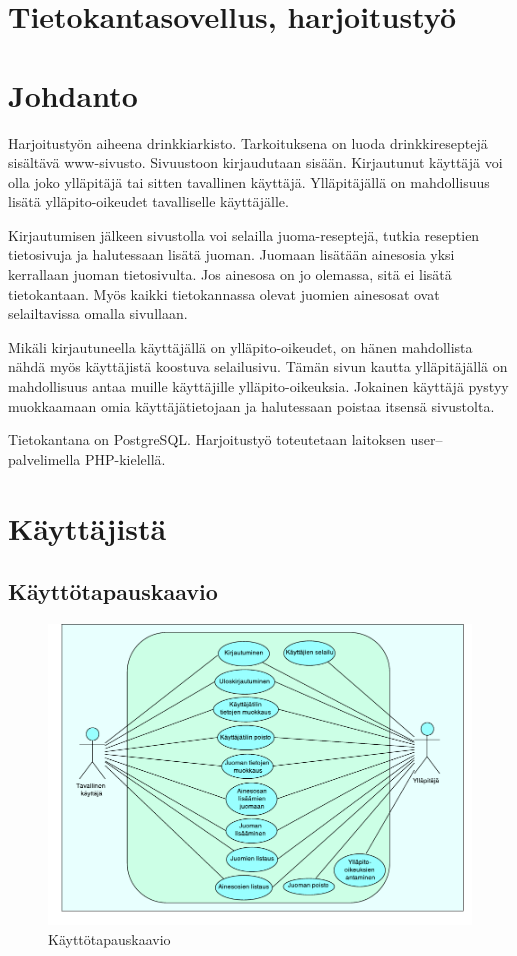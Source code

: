 \documentclass[a4paper]{article}
\begin{document}
\section*{Tietokantasovellus, harjoitustyö}

\tableofcontents

\section{Johdanto}

Harjoitustyön aiheena drinkkiarkisto. Tarkoituksena on luoda drinkkireseptejä sisältävä www-sivusto. Sivuustoon kirjaudutaan sisään. Kirjautunut käyttäjä voi olla joko ylläpitäjä tai sitten tavallinen käyttäjä. Ylläpitäjällä on mahdollisuus lisätä ylläpito-oikeudet tavalliselle käyttäjälle.   

Kirjautumisen jälkeen sivustolla voi selailla juoma-reseptejä, tutkia reseptien tietosivuja ja halutessaan lisätä juoman. Juomaan lisätään ainesosia yksi kerrallaan juoman tietosivulta. Jos ainesosa on jo olemassa, sitä ei lisätä tietokantaan. Myös kaikki tietokannassa olevat juomien ainesosat ovat selailtavissa omalla sivullaan. 

Mikäli kirjautuneella käyttäjällä on ylläpito-oikeudet, on hänen mahdollista nähdä myös käyttäjistä koostuva selailusivu. Tämän sivun  kautta ylläpitäjällä on mahdollisuus antaa muille käyttäjille ylläpito-oikeuksia. Jokainen käyttäjä pystyy muokkaamaan omia käyttäjätietojaan ja halutessaan poistaa itsensä sivustolta. 

Tietokantana on PostgreSQL. Harjoitustyö toteutetaan laitoksen user--palvelimella PHP-kielellä. 

\newpage
\section{Käyttäjistä}

\subsection{Käyttötapauskaavio}
\begin{figure}[h]
	\centering
	\includegraphics[scale=0.4]{kayttotapaukset.pdf}
	\caption{Käyttötapauskaavio}
\end{figure}
	
\end{document}
